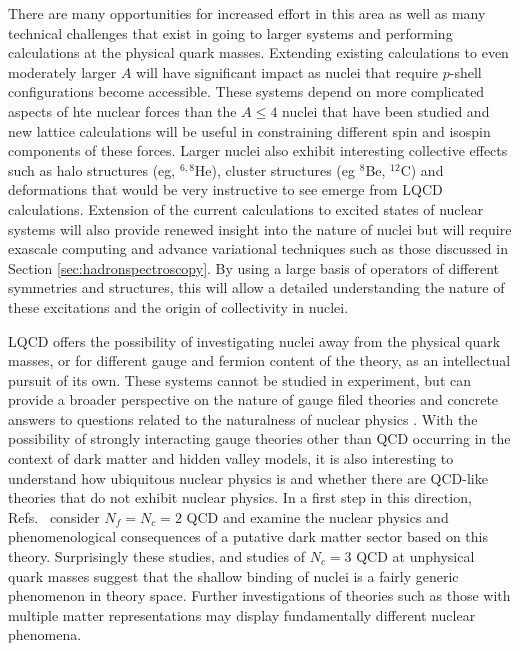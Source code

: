 There are many opportunities for increased effort in this area as well as many technical challenges that exist in going to larger systems and performing calculations at the physical quark masses. 
Extending existing calculations to even moderately larger $A$ will have significant impact as nuclei that require $p$-shell configurations become accessible. These systems depend on more complicated aspects of hte nuclear forces than the $A\le4$ nuclei that have been studied and new lattice calculations will be useful in constraining different spin and isospin components of these forces. Larger nuclei also exhibit interesting collective effects such as halo structures (eg,  ${}^{6,8}$He), cluster structures (eg ${}^{8}$Be, ${}^{12}$C) and deformations that would be very instructive to see emerge from LQCD calculations.  Extension of the current calculations to excited states of nuclear systems will also provide renewed insight into the nature of nuclei but will require exascale computing and advance variational techniques such as those discussed in Section \ref{sec:hadronspectroscopy}.
By using a large basis of operators of different symmetries and structures, this will allow a detailed understanding the nature of these excitations and the origin of collectivity in nuclei. 

LQCD offers the possibility of investigating nuclei away from the physical quark masses, or for different gauge and fermion content of the theory, as an intellectual pursuit of its own. These systems cannot be studied in experiment, but can provide a broader perspective on the nature of gauge filed theories and concrete answers to questions related to the naturalness of nuclear physics \cite{Orginos:2015aya,Epelbaum,AWTetal}. With the  possibility of strongly interacting gauge theories other than QCD occurring in the context of dark matter and hidden valley models, it is also interesting to understand how ubiquitous nuclear physics is and whether there are QCD-like theories that do not exhibit nuclear physics.  In a first step in this direction,  Refs.~\cite{Detmold:2014qqa,Detmold:2014kba}  consider $N_f=N_c=2$ QCD and examine the nuclear physics and phenomenological consequences of  a putative dark matter sector based on this theory. Surprisingly these studies, and studies of $N_c=3$ QCD at unphysical quark masses suggest that the shallow binding of nuclei is a fairly generic phenomenon in theory space. Further investigations of theories such as those with multiple matter representations \cite{Niel} may display fundamentally different nuclear phenomena.



